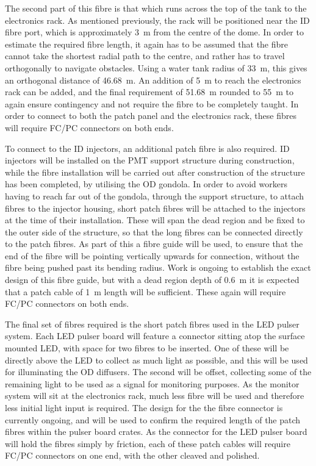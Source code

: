 \documentclass[a4paper,11pt]{article}
\begin{document}
The second part of this fibre is that which runs across the top of the tank to the electronics rack. As mentioned previously, the rack will be positioned near the ID fibre port, which is approximately 3~m from the centre of the dome. In order to estimate the required fibre length, it again has to be assumed that the fibre cannot take the shortest radial path to the centre, and rather has to travel orthogonally to navigate obstacles. Using a water tank radius of 33~m, this gives an orthogonal distance of 46.68~m. An addition of 5~m to reach the electronics rack can be added, and the final requirement of 51.68~m rounded to 55~m to again ensure contingency and not require the fibre to be completely taught. In order to connect to both the patch panel and the electronics rack, these fibres will require FC/PC connectors on both ends.

To connect to the ID injectors, an additional patch fibre is also required. ID injectors will be installed on the PMT support structure during construction, while the fibre installation will be carried out after construction of the structure has been completed, by utilising the OD gondola. In order to avoid workers having to reach far out of the gondola, through the support structure, to attach fibres to the injector housing, short patch fibres will be attached to the injectors at the time of their installation. These will span the dead region and be fixed to the outer side of the structure, so that the long fibres can be connected directly to the patch fibres. As part of this a fibre guide will be used, to ensure that the end of the fibre will be pointing vertically upwards for connection, without the fibre being pushed past its bending radius. {\color{red} Work is ongoing to establish the exact design of this fibre guide, but with a dead region depth of 0.6~m it is expected that a patch cable of 1~m length will be sufficient. These again will require FC/PC connectors on both ends.}

The final set of fibres required is the short patch fibres used in the LED pulser system. Each LED pulser board will feature a connector sitting atop the surface mounted LED, with space for two fibres to be inserted. One of these will be directly above the LED to collect as much light as possible, and this will be used for illuminating the OD diffusers. The second will be offset, collecting some of the remaining light to be used as a signal for monitoring purposes. As the monitor system will sit at the electronics rack, much less fibre will be used and therefore less initial light input is required. {\color{red} The design for the the fibre connector is currently ongoing, and will be used to confirm the required length of the patch fibres within the pulser board crates.} As the connector for the LED pulser board will hold the fibres simply by friction, each of these patch cables will require FC/PC connectors on one end, with the other cleaved and polished.
\end{document}
